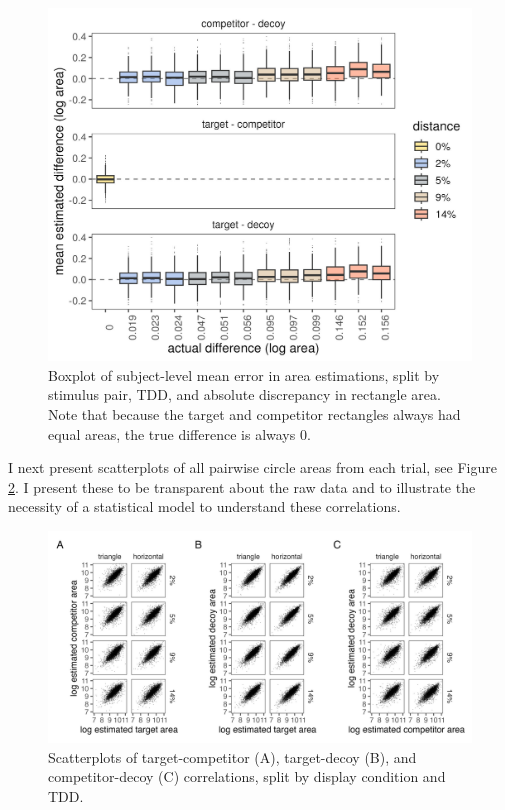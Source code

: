 \begin{figure}
   \includegraphics[width=\textwidth]{figures/circleAreaPhase_boxplot_meanlogdiffs_no_outliers.jpeg}
   \caption{Boxplot of subject-level mean error in area estimations, split by stimulus pair, TDD, and absolute discrepancy in rectangle area. Note that because the target and competitor rectangles always had equal areas, the true difference is always 0.}
   \label{fig:circle_boxplots}
\end{figure}

I next present scatterplots of all pairwise circle areas from each trial, see Figure \ref{fig:raw_cors}. I present these to be transparent about the raw data and to illustrate the necessity of a statistical model to understand these correlations. 

\begin{figure}
   \includegraphics[width=\textwidth]{figures/circleAreaPhase_cor_plot_all_no_outliers.jpg}
   \caption{Scatterplots of target-competitor (A), target-decoy (B), and competitor-decoy (C) correlations, split by display condition and TDD.}
   \label{fig:raw_cors}
\end{figure}

